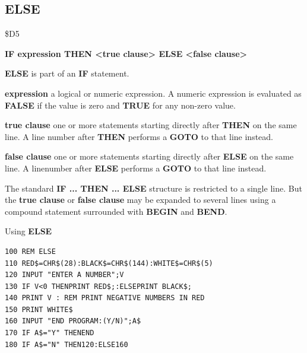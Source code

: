 \subsection{ELSE}
\begin{description}[leftmargin=2cm,style=nextline]
\item [Token:] \$D5
\item [Format:] {\bf IF expression THEN <true clause> ELSE <false clause>}
\item [Usage:] {\bf ELSE} is part of an {\bf IF}
               statement.

               {\bf expression} a logical or numeric expression.
               A numeric expression is evaluated as {\bf FALSE}
               if the value is zero and {\bf TRUE} for any non-zero
               value.

               {\bf true clause} one or more statements starting
               directly after {\bf THEN} on the same line.
               A line number after {\bf THEN} performs a
               {\bf GOTO} to that line instead.

               {\bf false clause} one or more statements starting
               directly after {\bf ELSE} on the same line.
               A linenumber after {\bf ELSE} performs a
               {\bf GOTO} to that line instead.

\item [Remarks:]
               The standard {\bf IF ... THEN ... ELSE} structure
               is restricted to a single line. But the {\bf true clause}
               or {\bf false clause} may be expanded to several lines
               using a compound statement surrounded with
               {\bf BEGIN} and {\bf BEND}.
\item [Example:]
                Using {\bf ELSE}
\begin{tcolorbox}[colback=black,coltext=white]
\verbatimfont{\codefont}
\begin{verbatim}
100 REM ELSE
110 RED$=CHR$(28):BLACK$=CHR$(144):WHITE$=CHR$(5)
120 INPUT "ENTER A NUMBER";V
130 IF V<0 THENPRINT RED$;:ELSEPRINT BLACK$;
140 PRINT V : REM PRINT NEGATIVE NUMBERS IN RED
150 PRINT WHITE$
160 INPUT "END PROGRAM:(Y/N)";A$
170 IF A$="Y" THENEND
180 IF A$="N" THEN120:ELSE160
\end{verbatim}
\end{tcolorbox}
\end{description}



